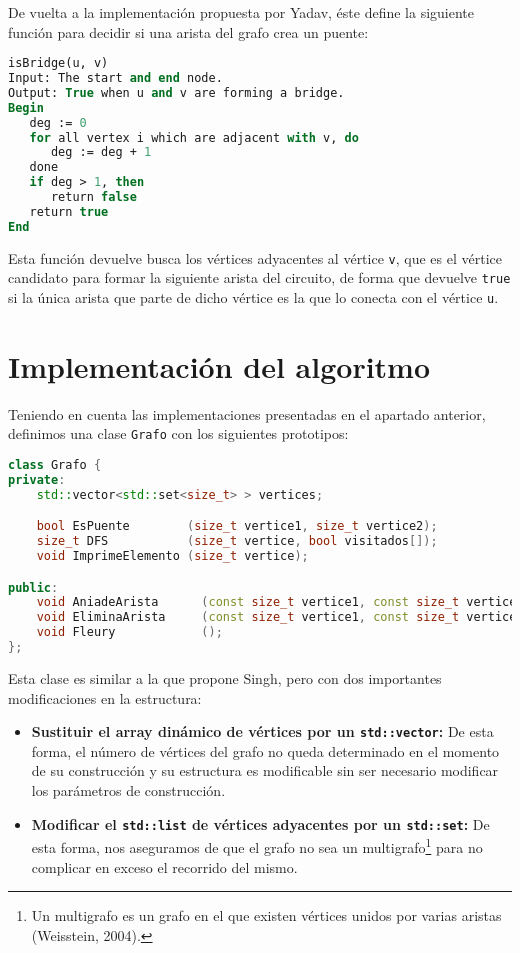 De vuelta a la implementación propuesta por Yadav, éste define la siguiente función para decidir si una arista del grafo crea un puente:

\begin{lstlisting}[language=Pascal]
isBridge(u, v)
Input: The start and end node.
Output: True when u and v are forming a bridge.
Begin
   deg := 0
   for all vertex i which are adjacent with v, do
      deg := deg + 1
   done
   if deg > 1, then
      return false
   return true
End
\end{lstlisting}

Esta función devuelve busca los vértices adyacentes al vértice \texttt{v}, que es el vértice candidato para formar la siguiente arista del circuito, de forma que devuelve \texttt{true} si la única arista que parte de dicho vértice es la que lo conecta con el vértice \texttt{u}.

\section{Implementación del algoritmo}\label{voraces-implementacion}

Teniendo en cuenta las implementaciones presentadas en el apartado anterior, definimos una clase \texttt{Grafo} con los siguientes prototipos:

\begin{lstlisting}[language=C++]
class Grafo {
private:
	std::vector<std::set<size_t> > vertices;

	bool EsPuente        (size_t vertice1, size_t vertice2);
	size_t DFS           (size_t vertice, bool visitados[]);
	void ImprimeElemento (size_t vertice);

public:
	void AniadeArista      (const size_t vertice1, const size_t vertice2);
	void EliminaArista     (const size_t vertice1, const size_t vertice2);
	void Fleury            ();
};
\end{lstlisting}

Esta clase es similar a la que propone Singh, pero con dos importantes modificaciones en la estructura:

\begin{itemize}
	\item\textbf{Sustituir el array dinámico de vértices por un \texttt{std::vector}:} De esta forma, el número de vértices del grafo no queda determinado en el momento de su construcción y su estructura es modificable sin ser necesario modificar los parámetros de construcción.
	\item\textbf{Modificar el \texttt{std::list} de vértices adyacentes por un \texttt{std::set}:} De esta forma, nos aseguramos de que el grafo no sea un multigrafo\footnote{%
		Un multigrafo es un grafo en el que existen vértices unidos por varias aristas (Weisstein, 2004).
	} para no complicar en exceso el recorrido del mismo.
\end{itemize}

